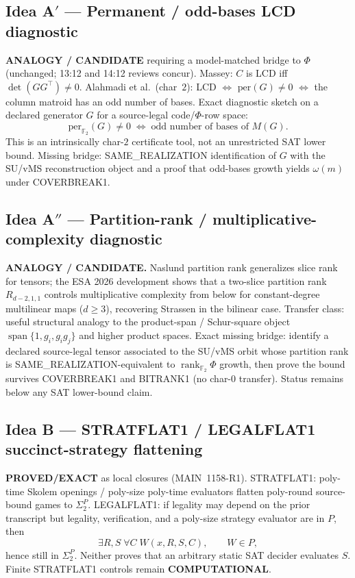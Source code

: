 \documentclass[11pt]{article}
\begin{document}
\subsection*{Idea A$'$ --- Permanent / odd-bases LCD diagnostic}
\textbf{ANALOGY / CANDIDATE} requiring a model-matched bridge to $\Phi$ (unchanged;
13:12 and 14:12 reviews concur). Massey: $C$ is LCD iff $\det(GG^\top)\neq 0$.
Alahmadi et al.\ (char~$2$): LCD $\Leftrightarrow$ $\mathrm{per}(G)\neq 0$ $\Leftrightarrow$ the column matroid
has an odd number of bases. Exact diagnostic sketch on a declared generator $G$ for a
source-legal code/$\Phi$-row space:
\[
\mathrm{per}_{\mathbb F_2}(G)\neq 0\;\Leftrightarrow\;\text{odd number of bases of }M(G).
\]
This is an intrinsically char-$2$ certificate tool, not an unrestricted SAT lower bound.
Missing bridge: SAME\_REALIZATION identification of $G$ with the SU/vMS reconstruction
object and a proof that odd-bases growth yields $\omega(m)$ under COVERBREAK1.

\subsection*{Idea A$''$ --- Partition-rank / multiplicative-complexity diagnostic}
\textbf{ANALOGY / CANDIDATE.} Naslund partition rank generalizes slice rank for tensors;
the ESA 2026 development shows that a two-slice partition rank $R_{d-2,1,1}$ controls
multiplicative complexity from below for constant-degree multilinear maps ($d\ge 3$),
recovering Strassen in the bilinear case. Transfer class: useful structural analogy to
the product-span / Schur-square object $\operatorname{span}\{1,g_i,g_ig_j\}$ and higher
product spaces. Exact missing bridge: identify a declared source-legal tensor associated
to the SU/vMS orbit whose partition rank is SAME\_REALIZATION-equivalent to
$\operatorname{rank}_{\mathbb F_2}\Phi$ growth, then prove the bound survives COVERBREAK1
and BITRANK1 (no char-$0$ transfer). Status remains below any SAT lower-bound claim.

\subsection*{Idea B --- STRATFLAT1 / LEGALFLAT1 succinct-strategy flattening}
\textbf{PROVED/EXACT} as local closures (MAIN~1158-R1).
STRATFLAT1: poly-time Skolem openings / poly-size poly-time evaluators flatten poly-round
source-bound games to $\Sigma_2^P$.
LEGALFLAT1: if legality may depend on the prior transcript but legality, verification, and a
poly-size strategy evaluator are in $P$, then
\[
\exists R,S\;\forall C\;W(x,R,S,C),\qquad W\in P,
\]
hence still in $\Sigma_2^P$. Neither proves that an arbitrary static SAT decider evaluates $S$.
Finite STRATFLAT1 controls remain \textbf{COMPUTATIONAL}.
\end{document}
